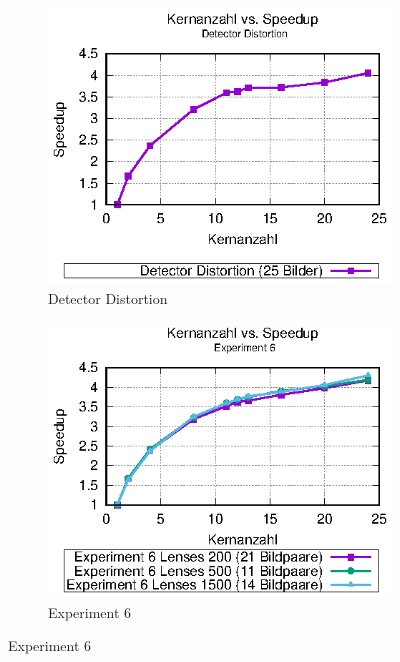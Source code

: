 \begin{center}
\begin{figure}[htbp]
	\begin{subfigure}[b]{0.325\textwidth}
		\centering
		\includegraphics[width=\textwidth]{pdf/speedup_detector_distortion}
		\caption[Detector Distortion]{Detector Distortion}
		\label{fig:speedup_det_dist}
	\end{subfigure}
	\hfill
	\begin{subfigure}[b]{0.325\textwidth}
		\centering
		\includegraphics[width=\textwidth]{pdf/speedup_exp6}
		\caption[Experiment 6]{Experiment 6}
		\label{fig:speedup_exp6}

\end{subfigure}
\end{figure}
\end{center}
